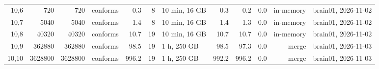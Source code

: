 \documentclass[10pt]{article}
\begin{document}
\begin{longtable}{@{}rrrlrrlrrrrl@{}}
\color{red} 10,6 & 720 & 720 & conforms & 0.3 & 8 & 10 min, 16 GB & 0.3 & 0.2 & 0.0 & in-memory & brain01, 2026-11-02 \\
\color{red} 10,7 & 5040 & 5040 & conforms & 1.4 & 8 & 10 min, 16 GB & 1.4 & 1.3 & 0.0 & in-memory & brain01, 2026-11-02 \\
\color{red} 10,8 & 40320 & 40320 & conforms & 10.7 & 19 & 10 min, 16 GB & 10.7 & 10.7 & 0.0 & in-memory & brain01, 2026-11-02 \\
\color{blue} 10,9 & 362880 & 362880 & conforms & 98.5 & 19 & 1 h, 250 GB & 98.5 & 97.3 & 0.0 & merge & brain01, 2026-11-03 \\
\color{blue} 10,10 & 3628800 & 3628800 & conforms & 996.2 & 19 & 1 h, 250 GB & 992.2 & 996.2 & 0.0 & merge & brain01, 2026-11-03 \\
\bottomrule
\end{longtable}
\end{document}
